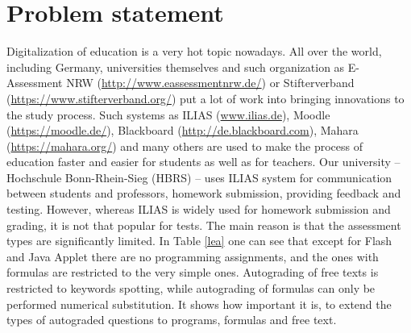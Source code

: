 \chapter{Problem statement}

Digitalization of education is a very hot topic nowadays. All over the world, including Germany, universities themselves and such organization as E-Assessment NRW (\url{http://www.eassessmentnrw.de/}) or Stifterverband (\url{https://www.stifterverband.org/}) put a lot of work into bringing innovations to the study process. Such systems as ILIAS (\url{www.ilias.de}), Moodle (\url{https://moodle.de/}), Blackboard (\url{http://de.blackboard.com}), Mahara (\url{https://mahara.org/}) and many others are used to make the process of education faster and easier for students as well as for teachers. Our university -- Hochschule Bonn-Rhein-Sieg (HBRS) -- uses ILIAS system for communication between students and professors, homework submission, providing feedback and testing. However, whereas ILIAS is widely used for homework submission and grading, it is not that popular for tests. The main reason is that the assessment types are significantly limited. In Table \ref{lea} one can see that except for Flash and Java Applet there are no programming assignments, and the ones with formulas are restricted to the very simple ones. Autograding of free texts is restricted to keywords spotting, while autograding of formulas can only be performed numerical substitution. It shows how important it is, to extend the types of autograded questions to programs, formulas and free text.\\

